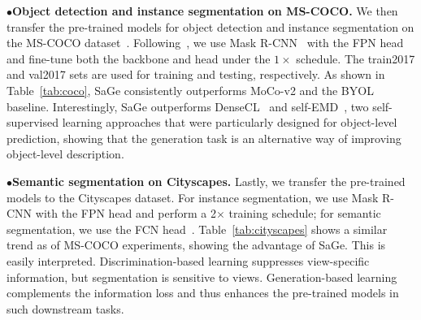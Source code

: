 \documentclass[10pt,twocolumn,letterpaper]{article}
\begin{document}
\vspace{0.1cm}\noindent
$\bullet$\hspace{0.2cm}\textbf{Object detection and instance segmentation on MS-COCO.} We then transfer the pre-trained models for object detection and instance segmentation on the MS-COCO dataset~\cite{lin2014coco}. Following~\cite{he2020momentum}, we use Mask R-CNN~\cite{he2017mask} with the FPN head~\cite{lin2017feature} and fine-tune both the backbone and head under the $1\times$ schedule. The train2017 and val2017 sets are used for training and testing, respectively. As shown in Table~\ref{tab:coco}, SaGe consistently outperforms MoCo-v2 and the BYOL baseline. Interestingly, SaGe outperforms DenseCL~\cite{wang2021dense} and self-EMD~\cite{liu2020self}, two self-supervised learning approaches that were particularly designed for object-level prediction, showing that the generation task is an alternative way of improving object-level description.

\vspace{0.1cm}\noindent
$\bullet$\hspace{0.2cm}\textbf{Semantic segmentation on Cityscapes.}
Lastly, we transfer the pre-trained models to the Cityscapes dataset. For instance segmentation, we use Mask R-CNN with the FPN head and perform a 2$\times$ training schedule; for semantic segmentation, we use the FCN head~\cite{long2015fully}. Table~\ref{tab:cityscapes} shows a similar trend as of MS-COCO experiments, showing the advantage of SaGe. This is easily interpreted. Discrimination-based learning suppresses view-specific information, but segmentation is sensitive to views. Generation-based learning complements the information loss and thus enhances the pre-trained models in such downstream tasks.
\end{document}

